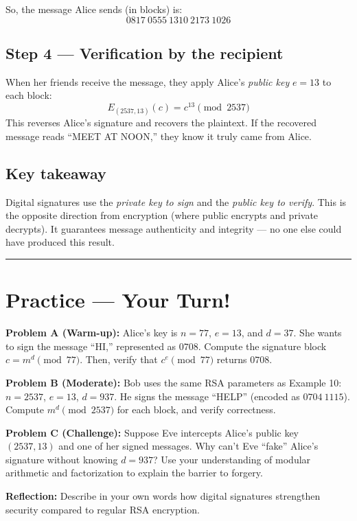 \documentclass[12pt]{article}
\newcommand{\workbox}[1]{\fbox{\parbox{\dimexpr\textwidth-2\fboxsep-2\fboxrule\relax}{\vspace{#1}}}}
\begin{document}
So, the message Alice sends (in blocks) is:
\[
0817\ 0555\ 1310\ 2173\ 1026
\]

\subsection*{Step 4 — Verification by the recipient}
When her friends receive the message, they apply Alice’s \emph{public key} \( e = 13 \) to each block:
\[
E_{(2537,13)}(c) = c^{13} \pmod{2537}
\]
This reverses Alice’s signature and recovers the plaintext.  
If the recovered message reads “MEET AT NOON,” they know it truly came from Alice.

\subsection*{Key takeaway}
Digital signatures use the \emph{private key to sign} and the \emph{public key to verify}.  
This is the opposite direction from encryption (where public encrypts and private decrypts).  
It guarantees message authenticity and integrity — no one else could have produced this result.

\vspace{1em}
\hrule
\vspace{0.5em}

\section*{Practice — Your Turn!}

\textbf{Problem A (Warm-up):}  
Alice’s key is \( n = 77 \), \( e = 13 \), and \( d = 37 \).  
She wants to sign the message “HI,” represented as \( 0708 \).  
Compute the signature block \( c = m^d \pmod{77} \).  
Then, verify that \( c^e \pmod{77} \) returns \( 0708 \).
\workbox{3cm}

\textbf{Problem B (Moderate):}  
Bob uses the same RSA parameters as Example 10: \( n = 2537 \), \( e = 13 \), \( d = 937 \).  
He signs the message “HELP” (encoded as \( 0704\ 1115 \)).  
Compute \( m^d \pmod{2537} \) for each block, and verify correctness.
\workbox{4cm}

\textbf{Problem C (Challenge):}  
Suppose Eve intercepts Alice’s public key \( (2537, 13) \) and one of her signed messages.  
Why can’t Eve “fake” Alice’s signature without knowing \( d = 937 \)?  
Use your understanding of modular arithmetic and factorization to explain the barrier to forgery.  
\workbox{4cm}

\vspace{1em}
\textbf{Reflection:}  
Describe in your own words how digital signatures strengthen security compared to regular RSA encryption.  
\workbox{2cm}
\end{document}
